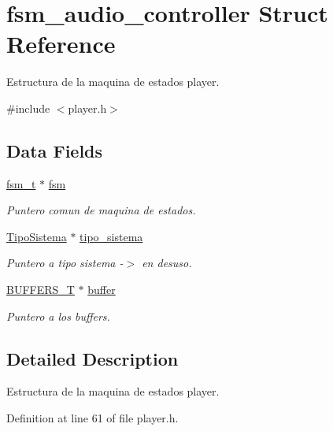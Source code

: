 \hypertarget{structfsm__audio__controller}{}\section{fsm\+\_\+audio\+\_\+controller Struct Reference}
\label{structfsm__audio__controller}


Estructura de la maquina de estados player.  




{\ttfamily \#include $<$player.\+h$>$}

\subsection*{Data Fields}
\begin{DoxyCompactItemize}
\item 
\mbox{\hyperlink{fsm_8h_ac7a7d1813cdcb9d4c76f575416188504}{fsm\+\_\+t}} $\ast$ \mbox{\hyperlink{structfsm__audio__controller_ac266ea0b7c96d1a0656ed46a9d3add6e}{fsm}}
\begin{DoxyCompactList}\small\item\em Puntero comun de maquina de estados. \end{DoxyCompactList}\item 
\mbox{\hyperlink{struct_tipo_sistema}{Tipo\+Sistema}} $\ast$ \mbox{\hyperlink{structfsm__audio__controller_a175991a577a3d507cc6f48adef71ef4e}{tipo\+\_\+sistema}}
\begin{DoxyCompactList}\small\item\em Puntero a tipo sistema -\/$>$ en desuso. \end{DoxyCompactList}\item 
\mbox{\hyperlink{player_8h_a60a77fbaea5edcaf4415b0adad33f411}{B\+U\+F\+F\+E\+R\+S\+\_\+T}} $\ast$ \mbox{\hyperlink{structfsm__audio__controller_a395b225759de943e9aba55fac03923e6}{buffer}}
\begin{DoxyCompactList}\small\item\em Puntero a los buffers. \end{DoxyCompactList}\end{DoxyCompactItemize}


\subsection{Detailed Description}
Estructura de la maquina de estados player. 

Definition at line 61 of file player.\+h.



